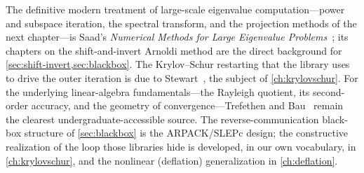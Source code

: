 \furtherreading
The definitive modern treatment of large-scale eigenvalue computation---power and
subspace iteration, the spectral transform, and the projection methods of the next
chapter---is Saad's \emph{Numerical Methods for Large Eigenvalue
Problems}~\citep{saad2011eig}; its chapters on the shift-and-invert Arnoldi method
are the direct background for \cref{sec:shift-invert,sec:blackbox}. The
Krylov--Schur restarting that the library uses to drive the outer iteration is due
to Stewart~\citep{stewart2001krylovschur}, the subject of \cref{ch:krylovschur}.
For the underlying linear-algebra fundamentals---the Rayleigh quotient, its
second-order accuracy, and the geometry of convergence---Trefethen and
Bau~\citep{trefethenbau1997} remain the clearest undergraduate-accessible source.
The reverse-communication black-box structure of \cref{sec:blackbox} is the
ARPACK/SLEPc design; the constructive realization of the loop those libraries hide
is developed, in our own vocabulary, in \cref{ch:krylovschur}, and the nonlinear
(deflation) generalization in \cref{ch:deflation}.

